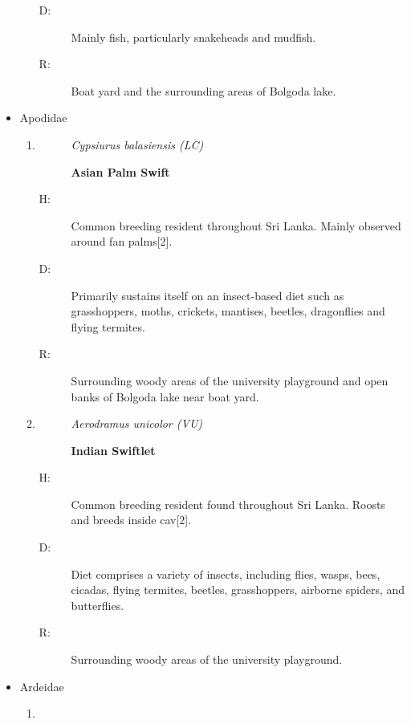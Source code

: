 \begin{itemize}
\begin{enumerate}
\begin{description}
\item[D: ]%
Mainly fish, particularly snakeheads and mudfish.%
\item[R: ]%
Boat yard and the surrounding areas of Bolgoda lake.%
\end{description}%
\end{enumerate}%
\item%
Apodidae%
\begin{enumerate}%
\item%
\begin{description}%
\item[]%
\textit{Cypsiurus balasiensis (LC)}%
\item[]%
\textbf{Asian Palm Swift}%
\end{description}%
\begin{description}%
\item[H: ]%
Common breeding resident throughout Sri Lanka. Mainly observed around fan palms{[}2{]}.%
\item[D: ]%
Primarily sustains itself on an insect{-}based diet such as grasshoppers, moths, crickets, mantises, beetles, dragonflies and flying termites.%
\item[R: ]%
Surrounding woody areas of the university playground and open banks of Bolgoda lake near boat yard.%
\end{description}%
\item%
\begin{description}%
\item[]%
\textit{Aerodramus unicolor (VU)}%
\item[]%
\textbf{Indian Swiftlet}%
\end{description}%
\begin{description}%
\item[H: ]%
Common breeding resident found throughout Sri Lanka. Roosts and breeds inside cav{[}2{]}.%
\item[D: ]%
Diet comprises a variety of insects, including flies, wasps, bees, cicadas, flying termites, beetles, grasshoppers, airborne spiders, and butterflies.%
\item[R: ]%
Surrounding woody areas of the university playground.%
\end{description}%
\end{enumerate}%
\item%
Ardeidae%
\begin{enumerate}%
\item%
\begin{description}%
\item[]%

\end{description}
\end{enumerate}
\end{itemize}
